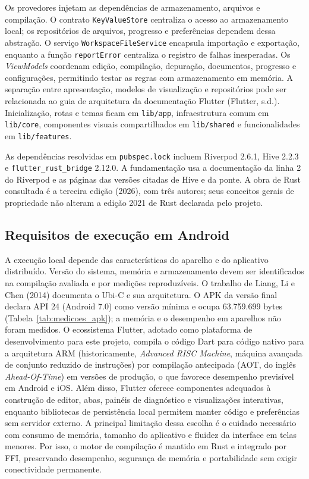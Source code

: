 \documentclass[
    12pt
    ,oneside
    ,a4paper
    ,chapter=TITLE
    ,section=TITLE
    ,sumario=abnt-6027-2012]{abntex2}
\begin{document}
Os provedores injetam as dependências de armazenamento, arquivos e compilação. O contrato
\texttt{KeyValueStore} centraliza o acesso ao armazenamento local; os repositórios de
arquivos, progresso e preferências dependem dessa abstração. O serviço
\texttt{WorkspaceFileService} encapsula importação e exportação, enquanto a função
\texttt{reportError} centraliza o registro de falhas inesperadas. Os \textit{ViewModels}
coordenam edição, compilação, depuração, documentos, progresso e configurações, permitindo
testar as regras com armazenamento em memória. A separação entre apresentação,
modelos de visualização e repositórios pode ser relacionada ao guia de arquitetura
da documentação Flutter (Flutter, s.d.). Inicialização, rotas e temas ficam em
\texttt{lib/app}, infraestrutura comum em \texttt{lib/core}, componentes visuais
compartilhados em \texttt{lib/shared} e funcionalidades em \texttt{lib/features}.

As dependências resolvidas em \texttt{pubspec.lock} incluem Riverpod 2.6.1,
Hive 2.2.3 e \texttt{flutter\_rust\_bridge} 2.12.0. A fundamentação usa a
documentação da linha 2 do Riverpod e as páginas das versões citadas de Hive
e da ponte. A obra de Rust consultada é a terceira edição (2026), com três
autores; seus conceitos gerais de propriedade não alteram a edição 2021
de Rust declarada pelo projeto.

\subsection{Requisitos de execução em Android}

A execução local depende das características do aparelho e do aplicativo
distribuído. Versão do sistema, memória e armazenamento devem ser identificados
na compilação avaliada e por medições reproduzíveis. O trabalho de Liang, Li e
Chen (2014) documenta o Ubi-C e sua arquitetura. O APK da versão final declara API 24
(Android 7.0) como versão mínima e ocupa 63.759.699 bytes
(Tabela~\ref{tab:medicoes_apk}); a memória e o desempenho em aparelhos não foram
medidos.
O ecossistema Flutter, adotado como plataforma de desenvolvimento para este projeto, compila o
código Dart para código nativo para a arquitetura ARM (historicamente, \textit{Advanced RISC Machine}, máquina avançada de conjunto reduzido de instruções) por compilação antecipada (AOT, do inglês \textit{Ahead-Of-Time}) em versões de
produção, o que favorece desempenho previsível em Android e iOS. Além disso, Flutter oferece
componentes adequados à construção de editor, abas, painéis de diagnóstico e visualizações
interativas, enquanto bibliotecas de persistência local permitem manter código e preferências
sem servidor externo. A principal limitação dessa escolha é o cuidado necessário com consumo de
memória, tamanho do aplicativo e fluidez da interface em telas menores. Por isso, o motor de
compilação é mantido em Rust e integrado por FFI, preservando desempenho, segurança de memória e
portabilidade sem exigir conectividade permanente.
\end{document}
